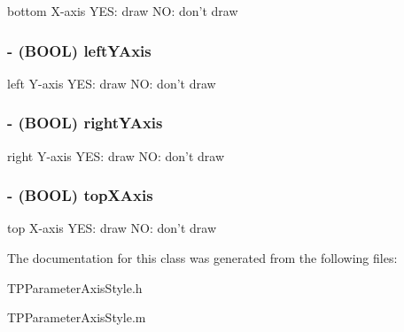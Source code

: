 bottom X-axis YES: draw NO: don't draw \hypertarget{interface_t_p_parameter_axis_style_78a223caf4b42242604f27c1506d25ec}{
\subsubsection[{leftYAxis}]{\setlength{\rightskip}{0pt plus 5cm}- (BOOL) leftYAxis}}
\label{interface_t_p_parameter_axis_style_78a223caf4b42242604f27c1506d25ec}


left Y-axis YES: draw NO: don't draw \hypertarget{interface_t_p_parameter_axis_style_1e8f22695a7b7ddb29e6355c6533d7bd}{
\subsubsection[{rightYAxis}]{\setlength{\rightskip}{0pt plus 5cm}- (BOOL) rightYAxis}}
\label{interface_t_p_parameter_axis_style_1e8f22695a7b7ddb29e6355c6533d7bd}


right Y-axis YES: draw NO: don't draw \hypertarget{interface_t_p_parameter_axis_style_023f3d06469c12184a8e87cca3a75a02}{
\subsubsection[{topXAxis}]{\setlength{\rightskip}{0pt plus 5cm}- (BOOL) topXAxis}}
\label{interface_t_p_parameter_axis_style_023f3d06469c12184a8e87cca3a75a02}


top X-axis YES: draw NO: don't draw 

The documentation for this class was generated from the following files:\begin{CompactItemize}
\item 
TPParameterAxisStyle.h\item 
TPParameterAxisStyle.m\end{CompactItemize}
